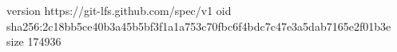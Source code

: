 version https://git-lfs.github.com/spec/v1
oid sha256:2c18bb5ce40b3a45b5bf3f1a1a753c70fbc6f4bdc7c47e3a5dab7165e2f01b3e
size 174936
